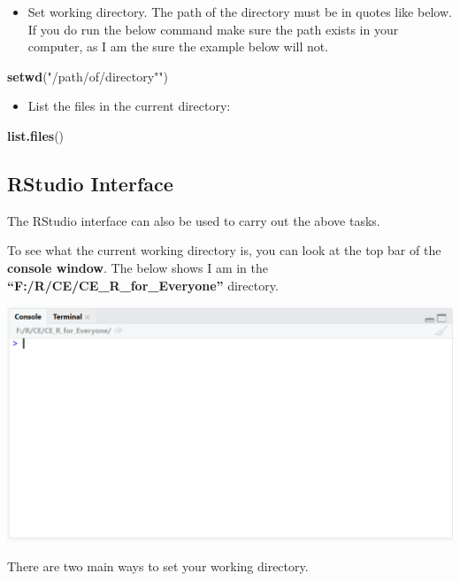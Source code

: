 \documentclass[]{book}
\newenvironment{Shaded}{\begin{snugshade}}{\end{snugshade}}
\newcommand{\KeywordTok}[1]{\textcolor[rgb]{0.13,0.29,0.53}{\textbf{#1}}}
\newcommand{\StringTok}[1]{\textcolor[rgb]{0.31,0.60,0.02}{#1}}
\newcommand{\NormalTok}[1]{#1}
\providecommand{\tightlist}{%
  \setlength{\itemsep}{0pt}\setlength{\parskip}{0pt}}
\begin{document}
\begin{itemize}
\tightlist
\item
  Set working directory. The path of the directory must be in quotes
  like below. If you do run the below command make sure the path exists
  in your computer, as I am the sure the example below will not.
\end{itemize}

\begin{Shaded}
\begin{Highlighting}[]
\KeywordTok{setwd}\NormalTok{(}\StringTok{"/path/of/directory"")}
\end{Highlighting}
\end{Shaded}

\begin{itemize}
\tightlist
\item
  List the files in the current directory:
\end{itemize}

\begin{Shaded}
\begin{Highlighting}[]
\KeywordTok{list.files}\NormalTok{()}
\end{Highlighting}
\end{Shaded}

\subsection{RStudio Interface}\label{rstudio-interface}

The RStudio interface can also be used to carry out the above tasks.

To see what the current working directory is, you can look at the top
bar of the \textbf{console window}. The below shows I am in the
\textbf{``F:/R/CE/CE\_R\_for\_Everyone''} directory.

\begin{center}\includegraphics[width=0.6\linewidth]{figures/current_wd} \end{center}

There are two main ways to set your working directory.
\end{document}
